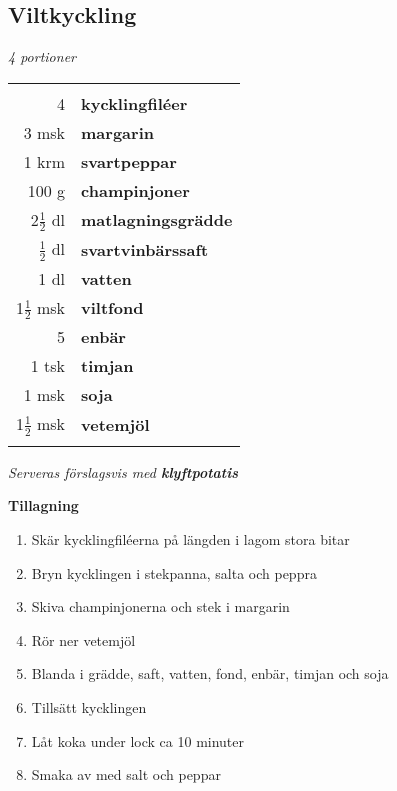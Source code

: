 \documentclass[a4paper,12pt]{article}
\newcommand{\port}[1]{\noindent \textit{#1 portioner}}
\newcommand{\tillb}[1]{\noindent \textit{Serveras förslagsvis med \textbf{#1}} \vspace{1cm}}
\begin{document}
\clearpage

\subsection{Viltkyckling}
\port{4}

\begin{table}[H]
	\begin{tabular}{rl}
	\hline
	&\\
		4 & \textbf{kycklingfiléer}\\
		3 msk & \textbf{margarin}\\
		1 krm & \textbf{svartpeppar}\\
		100 g & \textbf{champinjoner}\\
		2$\frac{1}{2}$ dl & \textbf{matlagningsgrädde}\\
		$\frac{1}{2}$ dl & \textbf{svartvinbärssaft}\\
		1 dl & \textbf{vatten}\\
		1$\frac{1}{2}$ msk & \textbf{viltfond}\\
		5 & \textbf{enbär}\\
		1 tsk & \textbf{timjan}\\
		1 msk & \textbf{soja}\\
		1$\frac{1}{2}$ msk & \textbf{vetemjöl}\\
	&\\
	\hline
	\end{tabular}
\end{table}

\tillb{klyftpotatis}

\begin{multicols*}{2}

\noindent \textbf{Tillagning}
\begin{enumerate}
	\itemsep0cm
	\item Skär kycklingfiléerna på \mbox{längden} i lagom stora bitar
	\item Bryn kycklingen i stekpanna, salta och peppra
	\item Skiva champinjonerna och stek i margarin
	\item Rör ner vetemjöl
	\item Blanda i grädde, saft, vatten, fond, enbär, timjan och soja
	\item Tillsätt kycklingen
	\item Låt koka under lock ca 10 \mbox{minuter}
	\item Smaka av med salt och peppar
\end{enumerate}

\end{multicols*}
\end{document}
